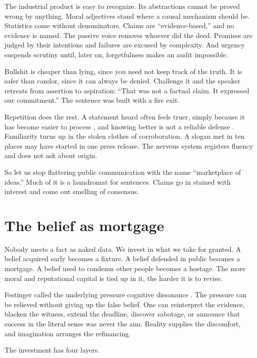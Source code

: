\documentclass[12pt,a4paper]{book}
\begin{document}
The industrial product is easy to recognize. Its abstractions cannot be proved wrong by anything. Moral adjectives stand where a causal mechanism should be. Statistics come without denominators. Claims are ``evidence-based,'' and no evidence is named. The passive voice removes whoever did the deed. Promises are judged by their intentions and failures are excused by complexity. And urgency suspends scrutiny until, later on, forgetfulness makes an audit impossible.

Bullshit is cheaper than lying, since you need not keep track of the truth. It is safer than candor, since it can always be denied. Challenge it and the speaker retreats from assertion to aspiration: ``That was not a factual claim. It expressed our commitment.'' The sentence was built with a fire exit.

Repetition does the rest. A statement heard often feels truer, simply because it has become easier to process \cite{HasherGoldsteinToppino1977}, and knowing better is not a reliable defense \cite{FazioEtAl2015}. Familiarity turns up in the stolen clothes of corroboration. A slogan met in ten places may have started in one press release. The nervous system registers fluency and does not ask about origin.

So let us stop flattering public communication with the name ``marketplace of ideas.'' Much of it is a laundromat for sentences. Claims go in stained with interest and come out smelling of consensus.

\section{The belief as mortgage}

Nobody meets a fact as naked data. We invest in what we take for granted. A belief acquired early becomes a fixture. A belief defended in public becomes a mortgage. A belief used to condemn other people becomes a hostage. The more moral and reputational capital is tied up in it, the harder it is to revise.

Festinger called the underlying pressure cognitive dissonance \cite{Festinger1957}. The pressure can be relieved without giving up the false belief. One can reinterpret the evidence, blacken the witness, extend the deadline, discover sabotage, or announce that success in the literal sense was never the aim. Reality supplies the discomfort, and imagination arranges the refinancing.

The investment has four layers.
\end{document}
